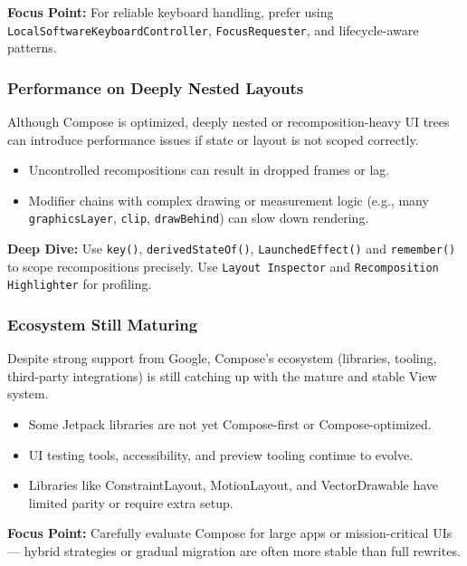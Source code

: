 \documentclass[a4paper,12pt]{article}
\begin{document}
\textbf{Focus Point:} For reliable keyboard handling, prefer using \texttt{LocalSoftwareKeyboardController}, \texttt{FocusRequester}, and lifecycle-aware patterns.

\subsubsection{Performance on Deeply Nested Layouts}

Although Compose is optimized, deeply nested or recomposition-heavy UI trees can introduce performance issues if state or layout is not scoped correctly.

\begin{itemize}
  \item Uncontrolled recompositions can result in dropped frames or lag.
  \item Modifier chains with complex drawing or measurement logic (e.g., many \texttt{graphicsLayer}, \texttt{clip}, \texttt{drawBehind}) can slow down rendering.
\end{itemize}

\textbf{Deep Dive:} Use \texttt{key()}, \texttt{derivedStateOf()}, \texttt{LaunchedEffect()} and \texttt{remember()} to scope recompositions precisely. Use \texttt{Layout Inspector} and \texttt{Recomposition Highlighter} for profiling.

\subsubsection{Ecosystem Still Maturing}

Despite strong support from Google, Compose's ecosystem (libraries, tooling, third-party integrations) is still catching up with the mature and stable View system.

\begin{itemize}
  \item Some Jetpack libraries are not yet Compose-first or Compose-optimized.
  \item UI testing tools, accessibility, and preview tooling continue to evolve.
  \item Libraries like ConstraintLayout, MotionLayout, and VectorDrawable have limited parity or require extra setup.
\end{itemize}

\textbf{Focus Point:} Carefully evaluate Compose for large apps or mission-critical UIs — hybrid strategies or gradual migration are often more stable than full rewrites.
\end{document}
